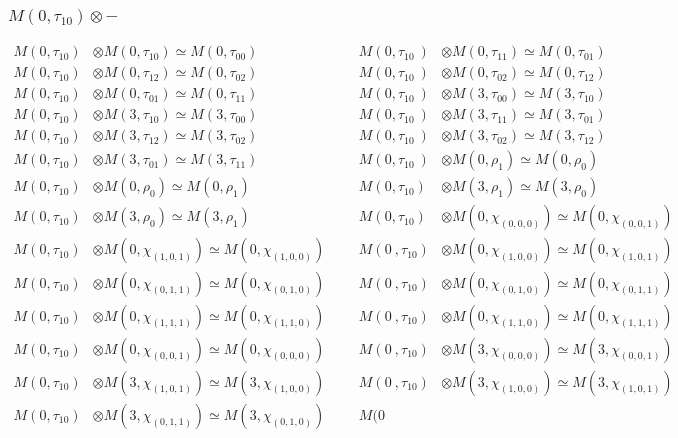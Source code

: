 \subsubsection{$M(0,\tau_{10})\otimes -$}
\begin{align*}
M(0,\tau_{10}) &\otimes M(0,\tau_{10}) \simeq M(0,\tau_{00}) &&& M(0,\tau_{10}\
) &\otimes M(0,\tau_{11}) \simeq M(0,\tau_{01})\\
M(0,\tau_{10}) &\otimes M(0,\tau_{12}) \simeq M(0,\tau_{02}) &&& M(0,\tau_{10}\
) &\otimes M(0,\tau_{02}) \simeq M(0,\tau_{12})\\
M(0,\tau_{10}) &\otimes M(0,\tau_{01}) \simeq M(0,\tau_{11}) &&& M(0,\tau_{10}\
) &\otimes M(3,\tau_{00}) \simeq M(3,\tau_{10})\\
M(0,\tau_{10}) &\otimes M(3,\tau_{10}) \simeq M(3,\tau_{00}) &&& M(0,\tau_{10}\
) &\otimes M(3,\tau_{11}) \simeq M(3,\tau_{01})\\
M(0,\tau_{10}) &\otimes M(3,\tau_{12}) \simeq M(3,\tau_{02}) &&& M(0,\tau_{10}\
) &\otimes M(3,\tau_{02}) \simeq M(3,\tau_{12})\\
M(0,\tau_{10}) &\otimes M(3,\tau_{01}) \simeq M(3,\tau_{11}) &&& M(0,\tau_{10}\
) &\otimes M(0,\rho_{1}) \simeq M(0,\rho_{0})\\
M(0,\tau_{10}) &\otimes M(0,\rho_{0}) \simeq M(0,\rho_{1}) &&& M(0,\tau_{10}) \
&\otimes M(3,\rho_{1}) \simeq M(3,\rho_{0})\\
M(0,\tau_{10}) &\otimes M(3,\rho_{0}) \simeq M(3,\rho_{1}) &&& M(0,\tau_{10}) \
&\otimes M(0,\chi_{(0,0,0)}) \simeq M(0,\chi_{(0,0,1)})\\
M(0,\tau_{10}) &\otimes M(0,\chi_{(1,0,1)}) \simeq M(0,\chi_{(1,0,0)}) &&& M(0\
,\tau_{10}) &\otimes M(0,\chi_{(1,0,0)}) \simeq M(0,\chi_{(1,0,1)})\\
M(0,\tau_{10}) &\otimes M(0,\chi_{(0,1,1)}) \simeq M(0,\chi_{(0,1,0)}) &&& M(0\
,\tau_{10}) &\otimes M(0,\chi_{(0,1,0)}) \simeq M(0,\chi_{(0,1,1)})\\
M(0,\tau_{10}) &\otimes M(0,\chi_{(1,1,1)}) \simeq M(0,\chi_{(1,1,0)}) &&& M(0\
,\tau_{10}) &\otimes M(0,\chi_{(1,1,0)}) \simeq M(0,\chi_{(1,1,1)})\\
M(0,\tau_{10}) &\otimes M(0,\chi_{(0,0,1)}) \simeq M(0,\chi_{(0,0,0)}) &&& M(0\
,\tau_{10}) &\otimes M(3,\chi_{(0,0,0)}) \simeq M(3,\chi_{(0,0,1)})\\
M(0,\tau_{10}) &\otimes M(3,\chi_{(1,0,1)}) \simeq M(3,\chi_{(1,0,0)}) &&& M(0\
,\tau_{10}) &\otimes M(3,\chi_{(1,0,0)}) \simeq M(3,\chi_{(1,0,1)})\\
M(0,\tau_{10}) &\otimes M(3,\chi_{(0,1,1)}) \simeq M(3,\chi_{(0,1,0)}) &&& M(0\

\end{align*}
